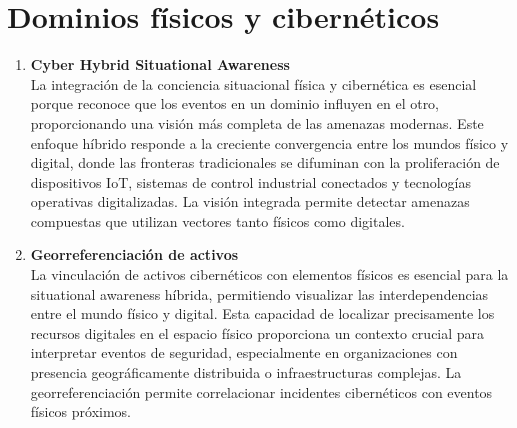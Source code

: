 \section{Dominios físicos y cibernéticos}
\begin{enumerate}[resume]
\item \textbf{Cyber Hybrid Situational Awareness} \\
La integración de la conciencia situacional física y cibernética es esencial porque reconoce que los eventos en un dominio influyen en el otro, proporcionando una visión más completa de las amenazas modernas. Este enfoque híbrido responde a la creciente convergencia entre los mundos físico y digital, donde las fronteras tradicionales se difuminan con la proliferación de dispositivos IoT, sistemas de control industrial conectados y tecnologías operativas digitalizadas. La visión integrada permite detectar amenazas compuestas que utilizan vectores tanto físicos como digitales.

\item \textbf{Georreferenciación de activos} \\
La vinculación de activos cibernéticos con elementos físicos es esencial para la situational awareness híbrida, permitiendo visualizar las interdependencias entre el mundo físico y digital. Esta capacidad de localizar precisamente los recursos digitales en el espacio físico proporciona un contexto crucial para interpretar eventos de seguridad, especialmente en organizaciones con presencia geográficamente distribuida o infraestructuras complejas. La georreferenciación permite correlacionar incidentes cibernéticos con eventos físicos próximos.

\end{enumerate}

